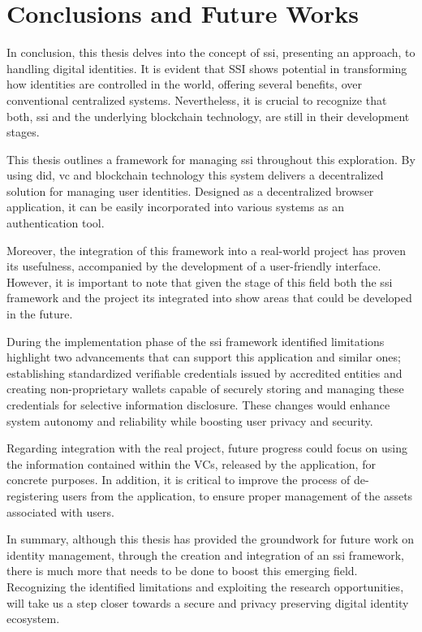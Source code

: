 \chapter{Conclusions and Future Works} \label{ch:conclusions}

In conclusion, this thesis delves into the concept of \acrfull{ssi}, presenting an approach, to handling digital identities. It is evident that SSI shows 
potential in transforming how identities are controlled in the world, offering several benefits, over conventional centralized systems. Nevertheless, it is crucial to 
recognize that both, \gls{ssi} and the underlying blockchain technology, are still in their development stages.

This thesis outlines a framework for managing \gls{ssi} throughout this exploration. By using \acrfull{did}, \acrfull{vc} and blockchain technology this system delivers a decentralized 
solution for managing user identities. Designed as a decentralized browser application, it can be easily incorporated into various systems as an authentication tool.

Moreover, the integration of this framework into a real-world project has proven its usefulness, accompanied by the development of a user-friendly interface. However, it is 
important to note that given the stage of this field both the \gls{ssi} framework and the project its integrated into show areas that could be developed in the future. 

During the implementation phase of the \gls{ssi} framework identified limitations highlight two advancements that can support this application and similar ones; establishing 
standardized verifiable credentials issued by accredited entities and creating non-proprietary wallets capable of securely storing and managing these credentials for 
selective information disclosure. These changes would enhance system autonomy and reliability while boosting user privacy and security.

Regarding integration with the real project, future progress could focus on using the information contained within the VCs, released by the application, for concrete purposes.
In addition, it is critical to improve the process of de-registering users from the application, to ensure proper management of the assets associated with users.

In summary, although this thesis has provided the groundwork for future work on identity management, through the creation and integration of an \gls{ssi} framework, there is 
much more that needs to be done to boost this emerging field. Recognizing the identified limitations and exploiting the research opportunities, will take us a step closer 
towards a secure and privacy preserving digital identity ecosystem. 